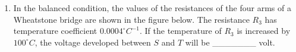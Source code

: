 
\begin{enumerate}
    \item In the balanced condition, the values of the resistances of the four arms of a Wheatstone bridge are shown in the figure below. The resistance \( R_3 \) has temperature coefficient \( 0.0004 ^\circ C^{-1} \). If the temperature of \( R_3 \) is increased by \( 100^\circ C \), the voltage developed between \( S \) and \( T \) will be \_\_\_\_\_\_\_ volt.
    \begin{center}
    \end{center}
\end{enumerate}
